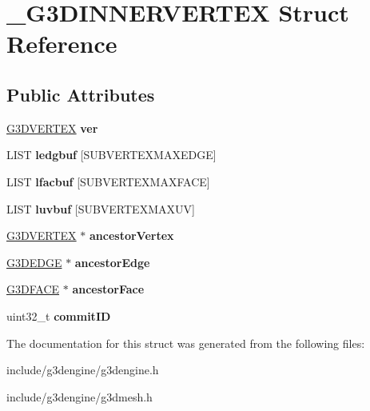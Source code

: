 \hypertarget{struct__G3DINNERVERTEX}{}\section{\+\_\+\+G3\+D\+I\+N\+N\+E\+R\+V\+E\+R\+T\+EX Struct Reference}
\label{struct__G3DINNERVERTEX}
\subsection*{Public Attributes}
\begin{DoxyCompactItemize}
\item 
\mbox{\label{struct__G3DINNERVERTEX_a532177365c691c47c80e84b69988d37c}} 
\hyperlink{struct__G3DVERTEX}{G3\+D\+V\+E\+R\+T\+EX} {\bfseries ver}
\item 
\mbox{\label{struct__G3DINNERVERTEX_aedd31d378db11e5d6b29c14dc5cc3cee}} 
L\+I\+ST {\bfseries ledgbuf} \mbox{[}S\+U\+B\+V\+E\+R\+T\+E\+X\+M\+A\+X\+E\+D\+GE\mbox{]}
\item 
\mbox{\label{struct__G3DINNERVERTEX_a8f14fff8831f128e56f36ff7365fa5da}} 
L\+I\+ST {\bfseries lfacbuf} \mbox{[}S\+U\+B\+V\+E\+R\+T\+E\+X\+M\+A\+X\+F\+A\+CE\mbox{]}
\item 
\mbox{\label{struct__G3DINNERVERTEX_ad201ae465d5c4aa53e998c3d7f824a56}} 
L\+I\+ST {\bfseries luvbuf} \mbox{[}S\+U\+B\+V\+E\+R\+T\+E\+X\+M\+A\+X\+UV\mbox{]}
\item 
\mbox{\label{struct__G3DINNERVERTEX_ac3767b0102aa06749da579ac47eccfae}} 
\hyperlink{struct__G3DVERTEX}{G3\+D\+V\+E\+R\+T\+EX} $\ast$ {\bfseries ancestor\+Vertex}
\item 
\mbox{\label{struct__G3DINNERVERTEX_afbcdad351adc13decf1f6d2133002c69}} 
\hyperlink{struct__G3DEDGE}{G3\+D\+E\+D\+GE} $\ast$ {\bfseries ancestor\+Edge}
\item 
\mbox{\label{struct__G3DINNERVERTEX_a2f9e0193ad3385e24ab6d8728966681d}} 
\hyperlink{struct__G3DFACE}{G3\+D\+F\+A\+CE} $\ast$ {\bfseries ancestor\+Face}
\item 
\mbox{\label{struct__G3DINNERVERTEX_a9fda4013e454c77be3fce30871768484}} 
uint32\+\_\+t {\bfseries commit\+ID}
\end{DoxyCompactItemize}


The documentation for this struct was generated from the following files\+:\begin{DoxyCompactItemize}
\item 
include/g3dengine/g3dengine.\+h\item 
include/g3dengine/g3dmesh.\+h\end{DoxyCompactItemize}
